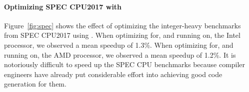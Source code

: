 \paragraph{Optimizing SPEC CPU2017 with \tool{}}

Figure~\ref{fig:spec} shows the effect of optimizing the integer-heavy
benchmarks from SPEC CPU2017 using \tool.
%
When optimizing for, and running on, the Intel processor, we observed a
mean speedup of 1.3\%.
%
When optimizing for, and running on, the AMD processor, we observed a
mean speedup of 1.2\%.
%
It is notoriously difficult to speed up the SPEC CPU benchmarks
because compiler engineers have already put considerable effort into
achieving good code generation for them.


\iffalse
\paragraph{Why does \tool{} sometimes make code run slower?}
%
\tool's cost model looks only at the (predicted) performance
 of an extracted fragment.
%
It could be the case that a locally profitable transformation is
unprofitable in a larger context.
%
Moreover, we fundamentally rely on LLVM-MCA to accurately assess the cost
on the target microarchitecture.%
However, LLVM-MCA is known to contain inaccuracies~\cite{ithemal,difftune,laukemann}.
\fi
